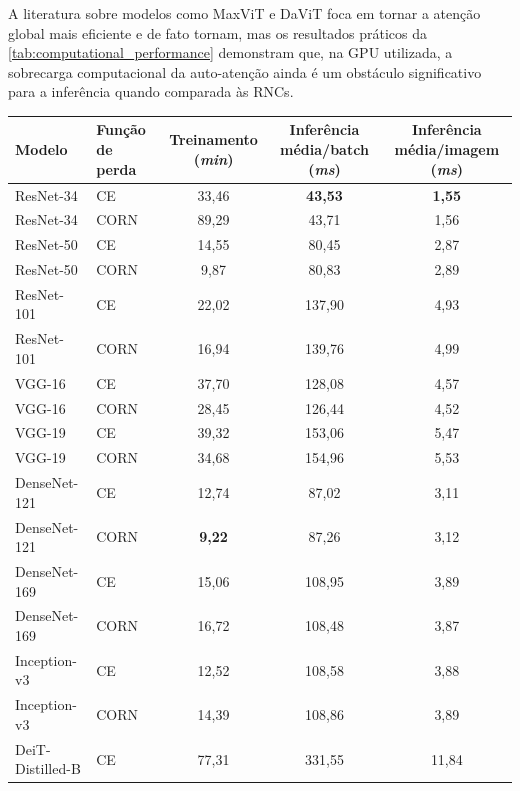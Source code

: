 A literatura sobre modelos como MaxViT e DaViT foca em tornar a atenção global mais eficiente e de fato tornam, mas os resultados práticos da \autoref{tab:computational_performance} demonstram que, na GPU utilizada, a sobrecarga computacional da auto-atenção ainda é um obstáculo significativo para a inferência quando comparada às RNCs.

\begin{table}
    \centering
    \begin{tabular}{|l|l|c|c|c|}
        \hline
        \textbf{Modelo} & \textbf{Função de perda} & \textbf{Treinamento (\textit{min})} & \textbf{Inferência média/batch (\textit{ms})} & \textbf{Inferência média/imagem (\textit{ms})} \\
        \hline
        ResNet-34 & CE & 33,46 & \textbf{43,53} & \textbf{1,55} \\
        \hline
        ResNet-34 & CORN & 89,29 & 43,71 & 1,56 \\
        \hline
        ResNet-50 & CE & 14,55 & 80,45 & 2,87 \\
        \hline
        ResNet-50 & CORN & 9,87 & 80,83 & 2,89 \\
        \hline
        ResNet-101 & CE & 22,02 & 137,90 & 4,93 \\
        \hline
        ResNet-101 & CORN & 16,94 & 139,76 & 4,99 \\
        \hline
        VGG-16 & CE & 37,70 & 128,08 & 4,57 \\
        \hline
        VGG-16 & CORN & 28,45 & 126,44 & 4,52 \\
        \hline
        VGG-19 & CE & 39,32 & 153,06 & 5,47 \\
        \hline
        VGG-19 & CORN & 34,68 & 154,96 & 5,53 \\
        \hline
        DenseNet-121 & CE & 12,74 & 87,02 & 3,11 \\
        \hline
        DenseNet-121 & CORN & \textbf{9,22} & 87,26 & 3,12 \\
        \hline
        DenseNet-169 & CE & 15,06 & 108,95 & 3,89 \\
        \hline
        DenseNet-169 & CORN & 16,72 & 108,48 & 3,87 \\
        \hline
        Inception-v3 & CE & 12,52 & 108,58 & 3,88 \\
        \hline
        Inception-v3 & CORN & 14,39 & 108,86 & 3,89 \\
        \hline
        DeiT-Distilled-B & CE & 77,31 & 331,55 & 11,84 \\

\end{tabular}
\end{table}
